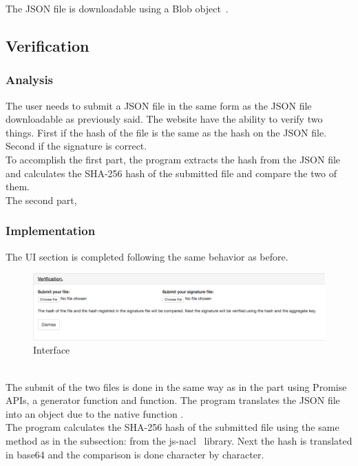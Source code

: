 \documentclass[11pt, a4paper, twoside, openright]{book} %
\begin{document}
The JSON file is downloadable using a Blob object~\cite{blob}.

\subsection{Verification}

\subsubsection{Analysis}
The user needs to submit a JSON file in the same form as the JSON file downloadable
as previously said. The website have the ability to verify two things.
First if the hash of the file is the same as the hash on the JSON file. Second if the signature
is correct.\\
To accomplish the first part, the program extracts the hash from the JSON file and
calculates the SHA-256 hash of the submitted file and compare the two of them.\\
The second part, %

\subsubsection{Implementation}
The UI section is completed following the same behavior as before.\\

\begin{figure}[ht!]
\centering
\includegraphics[width=125mm]{verification_verification.jpg}
\caption{Interface}
\end{figure}
\leavevmode \\

The submit of the two files is done in the same way as in the  part
using Promise APIs, a generator function and  function.
The program translates the JSON file into an object due to the native function .\\
The program calculates the SHA-256 hash of the submitted file using the same method as in the
subsection:  from the js-nacl~\cite{jsnacl} library.
Next the hash is translated in base64 and the comparison is done character by character.\\
\end{document}
